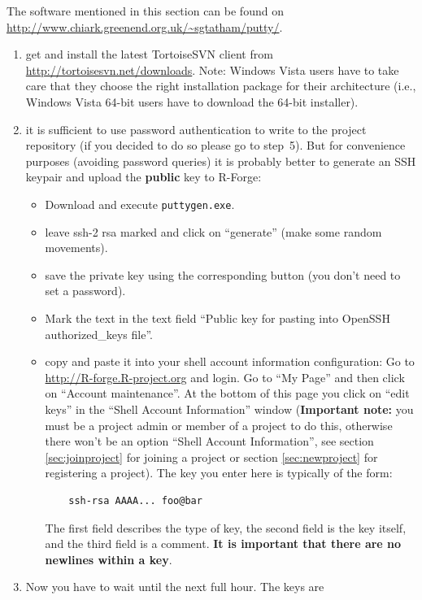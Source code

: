 \documentclass[a4paper]{article}
\newcommand{\proglang}[1]{\textsf{#1}}
\begin{document}
The software mentioned in this section can be found
on\newline
\url{http://www.chiark.greenend.org.uk/~sgtatham/putty/}.
\begin{enumerate}
\item get and install the latest TortoiseSVN client from
  \url{http://tortoisesvn.net/downloads}. Note: Windows Vista users
  have to take care that they choose the right installation package
  for their architecture (i.e., Windows Vista 64-bit users have to
  download the 64-bit installer).
\item it is sufficient to use password authentication to write to the
  project repository (if you decided to do so please go to
  step~5). But for convenience purposes (avoiding password 
  queries) it is probably better to
  generate an SSH keypair and upload the \textbf{public} 
  key to \proglang{R}-Forge:
  \begin{itemize}
  \item Download and execute \texttt{puttygen.exe}.
  \item leave ssh-2 rsa marked and click on ``generate'' (make some
    random movements).
  \item save the private key using the corresponding button (you don't
    need to set a password).
  \item  Mark the text in the text field ``Public key
    for pasting into OpenSSH authorized\_keys file''.
  \item copy and paste it into your shell account information
    configuration: Go to \url{http://R-forge.R-project.org} and
    login. Go to ``My Page'' and then click on ``Account
    maintenance''. At the bottom 
    of this page you click on ``edit keys'' in the ``Shell Account
    Information'' window (\textbf{Important note:} you must be a project admin
    or member of a project to do this, otherwise there won't be an
    option ``Shell Account Information'', see section
    \ref{sec:joinproject} for joining a project or section
    \ref{sec:newproject} for registering a project).
    The key you enter here is typically of the form:
    \begin{verbatim}
    ssh-rsa AAAA... foo@bar
    \end{verbatim}
    The first field
    describes the type of key, the second field is the key itself, and
    the third field is a comment. \textbf{It is important that there are no
      newlines within a key}.
  \end{itemize}
\item Now you have to wait until the next full hour. The keys are

\end{enumerate}
\end{document}
